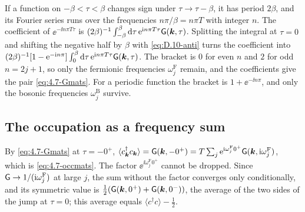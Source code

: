 If a function on $-\beta < \tau < \beta$ changes sign under $\tau \to \tau - \beta$, it has period $2\beta$, and its Fourier series runs over the frequencies $n\pi/\beta = n\pi T$ with integer $n$. The coefficient of $\ee^{-\ii n\pi T\tau}$ is $(2\beta)^{-1}\int_{-\beta}^{\beta}\mathrm{d}\tau\,\mathrm{e}^{\mathrm{i} n\pi T\tau}\mathsf{G}(\bm{k},\tau)$. Splitting the integral at $\tau = 0$ and shifting the negative half by $\beta$ with \cref{eq:D.10-anti} turns the coefficient into $(2\beta)^{-1}[1 - \mathrm{e}^{-\mathrm{i} n\pi}]\int_0^\beta\mathrm{d}\tau\,\mathrm{e}^{\mathrm{i} n\pi T\tau}\mathsf{G}(\bm{k},\tau)$. The bracket is $0$ for even $n$ and $2$ for odd $n = 2j + 1$, so only the fermionic frequencies $\omega^{\mathrm{F}}_j$ remain, and the coefficients give the pair \cref{eq:4.7-Gmats}. For a periodic function the bracket is $1 + \ee^{-\ii n\pi}$, and only the bosonic frequencies $\omega^{\mathrm{B}}_j$ survive.

\subsection*{The occupation as a frequency sum}

By \cref{eq:4.7-Gmats} at $\tau = -0^+$, $\langle c^\dagger_{\bm{k}}c_{\bm{k}}\rangle = \mathsf{G}(\bm{k},-0^+) = T\sum_j\mathrm{e}^{\mathrm{i}\omega^{\mathrm{F}}_j0^+}\mathsf{G}(\bm{k},\mathrm{i}\omega^{\mathrm{F}}_j)$, which is \cref{eq:4.7-occmats}. The factor $\ee^{\ii\omega^{\mathrm{F}}_j0^+}$ cannot be dropped. Since $\mathsf{G} \to 1/(\mathrm{i}\omega^{\mathrm{F}}_j)$ at large $j$, the sum without the factor converges only conditionally, and its symmetric value is $\tfrac12(\mathsf{G}(\bm{k},0^+) + \mathsf{G}(\bm{k},0^-))$, the average of the two sides of the jump at $\tau = 0$; this average equals $\langle c^\dagger c\rangle - \tfrac12$.

